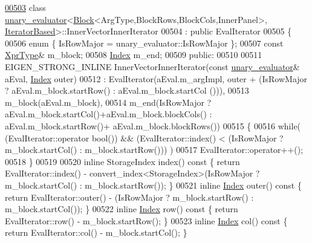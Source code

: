 \begin{DoxyCode}
\hyperlink{class_eigen_1_1internal_1_1unary__evaluator_3_01_block_3_01_arg_type_00_01_block_rows_00_01_bloc7b8c3454e32b582bbd24168a4ea19a1b}{00503} \textcolor{keyword}{class }\hyperlink{struct_eigen_1_1internal_1_1unary__evaluator}{unary\_evaluator}<\hyperlink{group___core___module_class_eigen_1_1_block}{Block}<ArgType,BlockRows,BlockCols,InnerPanel>, 
      \hyperlink{struct_eigen_1_1internal_1_1_iterator_based}{IteratorBased}>::InnerVectorInnerIterator
00504  : \textcolor{keyword}{public} EvalIterator
00505 \{
00506   \textcolor{keyword}{enum} \{ IsRowMajor = unary\_evaluator::IsRowMajor \};
00507   \textcolor{keyword}{const} \hyperlink{group___core___module_class_eigen_1_1_block}{XprType}& m\_block;
00508   \hyperlink{namespace_eigen_a62e77e0933482dafde8fe197d9a2cfde}{Index} m\_end;
00509 \textcolor{keyword}{public}:
00510 
00511   EIGEN\_STRONG\_INLINE InnerVectorInnerIterator(\textcolor{keyword}{const} \hyperlink{struct_eigen_1_1internal_1_1unary__evaluator}{unary\_evaluator}& aEval, 
      \hyperlink{namespace_eigen_a62e77e0933482dafde8fe197d9a2cfde}{Index} outer)
00512     : EvalIterator(aEval.m\_argImpl, outer + (IsRowMajor ? aEval.m\_block.startRow() : aEval.m\_block.startCol
      ())),
00513       m\_block(aEval.m\_block),
00514       m\_end(IsRowMajor ? aEval.m\_block.startCol()+aEval.m\_block.blockCols() : aEval.m\_block.startRow()+
      aEval.m\_block.blockRows())
00515   \{
00516     \textcolor{keywordflow}{while}( (EvalIterator::operator \textcolor{keywordtype}{bool}()) && (EvalIterator::index() < (IsRowMajor ? m\_block.startCol() : 
      m\_block.startRow())) )
00517       EvalIterator::operator++();
00518   \}
00519 
00520   \textcolor{keyword}{inline} StorageIndex index()\textcolor{keyword}{ const }\{ \textcolor{keywordflow}{return} EvalIterator::index() - convert\_index<StorageIndex>(IsRowMajor
       ? m\_block.startCol() : m\_block.startRow()); \}
00521   \textcolor{keyword}{inline} \hyperlink{namespace_eigen_a62e77e0933482dafde8fe197d9a2cfde}{Index} outer()\textcolor{keyword}{  const }\{ \textcolor{keywordflow}{return} EvalIterator::outer() - (IsRowMajor ? m\_block.startRow() : 
      m\_block.startCol()); \}
00522   \textcolor{keyword}{inline} \hyperlink{namespace_eigen_a62e77e0933482dafde8fe197d9a2cfde}{Index} row()\textcolor{keyword}{    const }\{ \textcolor{keywordflow}{return} EvalIterator::row()   - m\_block.startRow(); \}
00523   \textcolor{keyword}{inline} \hyperlink{namespace_eigen_a62e77e0933482dafde8fe197d9a2cfde}{Index} col()\textcolor{keyword}{    const }\{ \textcolor{keywordflow}{return} EvalIterator::col()   - m\_block.startCol(); \}

\end{DoxyCode}
